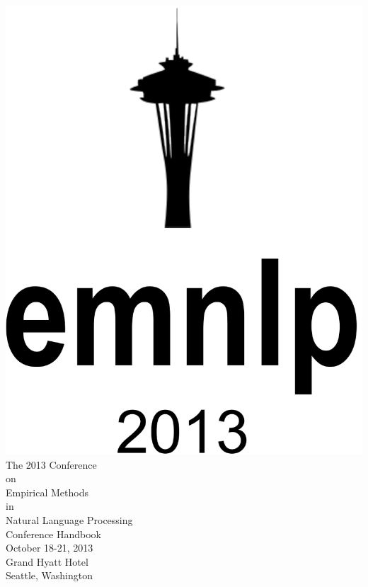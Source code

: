 \thispagestyle{empty}
\noindent
\begin{center}
\includegraphics[height=0.45\textheight]{venue/title-page-crop}\\[0.2in]
\vfill
\Large
The 2013 Conference\\
on\\
Empirical Methods\\
in\\
Natural Language Processing\\
\vfill
\Huge
Conference Handbook\\
\vfill
\Large
October 18-21, 2013\\
Grand Hyatt Hotel\\
Seattle, Washington
\end{center}

\clearpage

\renewcommand{\leftheader}{Message from the General Chair}
\renewcommand{\rightheader}{Message from the General Chair}
\null

\clearpage

\renewcommand{\leftheader}{EMNLP Organizing committee}
\renewcommand{\rightheader}{EMNLP Organizing committee}

